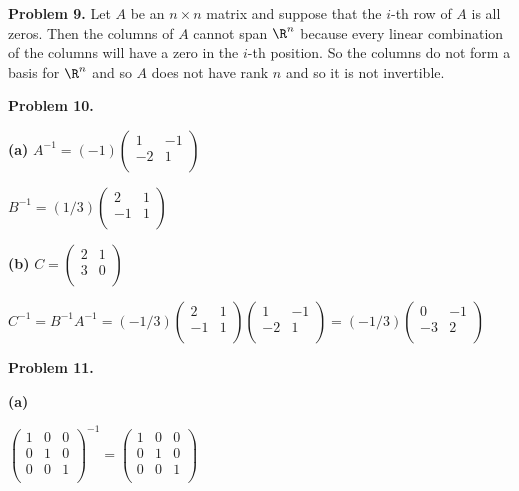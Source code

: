 \documentclass[oneside,12pt]{amsart}
\begin{document}
\bigskip

\textbf{Problem 9.} Let $A$ be an $n\times n$ matrix and suppose that the
$i$-th row of $A$ is all zeros. Then the columns of $A$ cannot span
$\R^n$ because every linear combination of the columns will have a zero
in the $i$-th position. So the columns do not form a basis for $\R^n$ and
so $A$ does not have rank $n$ and so it is not invertible.

\bigskip

\textbf{Problem 10.}

\textbf{(a)}
$
A^{-1}=
(-1)
\begin{pmatrix}
1 & -1 \\
-2 & 1 \\
\end{pmatrix}
$

$
B^{-1}=
(1/3)
\begin{pmatrix}
2 & 1 \\
-1 & 1 \\
\end{pmatrix}
$

\bigskip

\textbf{(b)}
$
C=
\begin{pmatrix}
2 & 1 \\
3 & 0 \\
\end{pmatrix}
$

$
C^{-1} = B^{-1} A^{-1}=
(-1/3)
\begin{pmatrix}
2 & 1 \\
-1 & 1 \\
\end{pmatrix}
\begin{pmatrix}
1 & -1 \\
-2 & 1 \\
\end{pmatrix}
=
(-1/3)
\begin{pmatrix}
 0  & -1 \\
-3 &  2 \\
\end{pmatrix}
$


\bigskip

\textbf{Problem 11.}

\textbf{(a)}

$
\begin{pmatrix}
1 & 0 & 0 \\
0 & 1 & 0 \\
0 & 0 & 1 \\
\end{pmatrix}^{-1}
=
\begin{pmatrix}
1 & 0 & 0 \\
0 & 1 & 0 \\
0 & 0 & 1 \\
\end{pmatrix}
$
\end{document}
